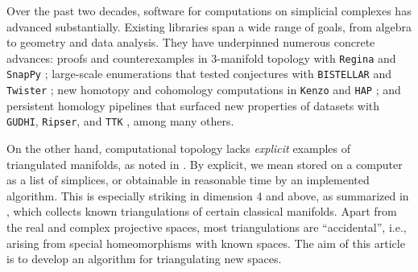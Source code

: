 \documentclass[a4paper,english,cleveref,autoref,thm-restate,nolineno]{socg-lipics-v2021}
\begin{document}
Over the past two decades, software for computations on simplicial complexes has advanced substantially. 
Existing libraries span a wide range of goals, from algebra to geometry and data analysis.
They have underpinned numerous concrete advances: proofs and counterexamples in 3-manifold topology with \texttt{Regina} and \texttt{SnapPy} \cite{regina,SnapPy}; large-scale enumerations that tested conjectures with \texttt{BISTELLAR} and \texttt{Twister} \cite{bjorner2000simplicial,Twister}; new homotopy and cohomology computations in \texttt{Kenzo} and \texttt{HAP} \cite{Kenzo,Ellis2025}; and persistent homology pipelines that surfaced new properties of datasets with \texttt{GUDHI}, \texttt{Ripser}, and \texttt{TTK} \cite{maria2014gudhi,bauer2021ripser,Tierny2017TTK}, among many others.

On the other hand, computational topology lacks \textit{explicit} examples of triangulated manifolds, as noted in \cite{benedetti2014random,filakovsky2020two,ballester2024mantra,telyatnikov2024topobench}.
By explicit, we mean stored on a computer as a list of simplices, or obtainable in reasonable time by an implemented algorithm.
This is especially striking in dimension 4 and above, as summarized in , which collects known triangulations of certain classical manifolds.
Apart from the real and complex projective spaces, most triangulations are ``accidental'', i.e., arising from special homeomorphisms with known spaces.
The aim of this article is to develop an algorithm for triangulating new spaces.
\end{document}
